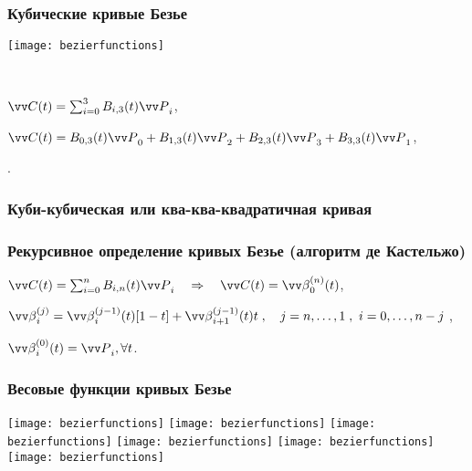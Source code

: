 \documentclass[10pt]{beamer}
\begin{document}
\begin{frame}\frametitle{Кубические кривые Безье}
	{
	}{
		\begin{center}
			\texttt{[image: bezierfunctions]}
		\end{center}
		
		~
		
		$\VV C(t)=\sum_{i=0}^3B_{i,3}(t)\VV P_i$,

	}
	
	$\VV C(t) = B_{0,3}(t) \VV P_0+B_{1,3}(t) \VV P_2+B_{2,3}(t) \VV P_3+B_{3,3}(t) \VV P_1$,
	
	.
	
\end{frame}

\begin{frame}\frametitle{Куби-кубическая или ква-ква-квадратичная кривая}
	
	\centering
	
\end{frame}


\begin{frame}\frametitle{Рекурсивное определение кривых Безье (алгоритм де Кастельжо)}
	
{
			\centering
}

	\vspace{-1.5ex}
	$\VV C(t)=\sum_{i=0}^nB_{i,n}(t)\VV P_i \quad \Rightarrow \quad \VV C(t) = \VV\beta_0^{(n)}(t)$,
	
	$\VV\beta_i^{(j)} = \VV\beta_i^{(j-1)}(t) [1-t] + \VV\beta_{i+1}^{(j-1)}(t) t\;, \quad j= n,\ldots,1\;, \ i = 0,\ldots,n-j\;$,
	
	$\VV\beta_i^{(0)}(t)=\VV P_i, \forall t$.
	
\end{frame}


\begin{frame}\frametitle{Весовые функции кривых Безье}
	
	\texttt{[image: bezierfunctions]}
	\texttt{[image: bezierfunctions]}
	\texttt{[image: bezierfunctions]}
	\texttt{[image: bezierfunctions]}
	\texttt{[image: bezierfunctions]}
	\texttt{[image: bezierfunctions]}
	
\end{frame}
\end{document}
